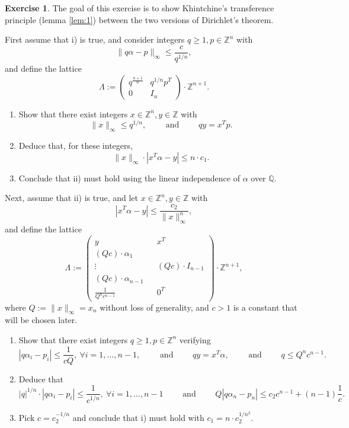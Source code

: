 \documentclass[12pt,a4paper]{article}
\theoremstyle{plain}
\newtheorem*{Sol*}{Solution}
\theoremstyle{definition}
\newtheorem{Ex}{Exercise}
\def \Q {\mathbb Q}
\def \Z {\mathbb Z}
\newif\ifsolutions
\newcommand{\exercise}[2]{
			\begin{Ex} #1 \end{Ex}
			\ifsolutions  \begin{Sol*} #2 \end{Sol*} \bigskip \else \bigskip  \fi
		}
\begin{document}
\exercise{
	The goal of this exercise is to show Khintchine's transference principle (lemma \ref{lem:1}) between the two versions of Dirichlet's theorem.

	First assume that i) is true, and consider integers $q \geq 1, p \in \Z^n$ with
		\[ \| q \alpha - p \|_\infty \leq \frac{c}{q^{1/n}}, \]
	and define the lattice 
		\[ \Lambda := \begin{pmatrix} q^{\frac{n+1}n} & q^{1/n} p^T \\ 0 & I_n \end{pmatrix} \cdot \Z^{n+1}.\]

	\begin{enumerate}
		\item Show that there exist integers $x \in \Z^n, y \in \Z$ with
			\[ \| x \|_\infty \leq q^{1/n}, \qquad \text{ and } \qquad qy = x^Tp.\]
		\item Deduce that, for these integers,
			\[  \| x \|_\infty \cdot | x^T \alpha - y | \leq n \cdot c_1. \]
		\item Conclude that ii) must hold using the linear independence of $\alpha$ over $\Q$.
	\end{enumerate}

	Next, assume that ii) is true, and let $x \in \Z^n, y \in \Z$ with
		\[ | x^T \alpha - y | \leq \frac{c_2}{ \| x \|_\infty^n}, \]
	and define the lattice 
		\[ \Lambda := \begin{pmatrix} y & & x^T \\ (Qc)\cdot\alpha_1 & & \\ \vdots & & (Qc) \cdot I_{n-1} \\ (Qc)\cdot\alpha_{n-1} & & \\ \frac{1}{Q^n c^{n-1}} & & 0^T \end{pmatrix} \cdot \Z^{n+1},\]
	where $Q := \| x \|_\infty = x_n$ without loss of generality, and $c > 1$ is a constant that will be chosen later.

	\begin{enumerate}
		\item Show that there exist integers $q \geq 1, p \in \Z^n$ verifying
			\[ | q \alpha_i - p_i | \leq \frac{1}{cQ}, \ \forall i=1, \dots, n-1, \qquad \text{ and } \qquad qy = x^T\alpha, \qquad \text{ and } \qquad q \leq Q^n c^{n-1}. \]
		\item Deduce that 
			\[ |q|^{1/n} \cdot | q \alpha_i - p_i | \leq \frac{1}{c^{1/n}}, \ \forall i=1, \dots, n-1 \qquad \text{ and } \qquad Q | q \alpha_n - p_n| \leq c_2 c^{n-1} + (n-1)\frac1c.\]
		\item Pick $c = c_2^{-1/n}$ and conclude that i) must hold with $c_1 = n \cdot c_2^{1/n^2}.$
	\end{enumerate}
}
{}
\end{document}
